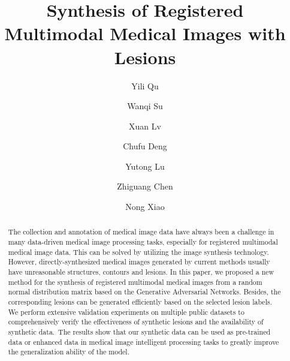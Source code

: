 \documentclass[runningheads]{llncs}
\begin{document}
	\title{Synthesis of Registered Multimodal
		Medical Images with Lesions}
	\author{ Yili Qu \and Wanqi Su \and Xuan Lv \and Chufu Deng 
		\and Yutong Lu \and Zhiguang Chen \and Nong Xiao}
	\maketitle       %
	\begin{abstract}
		The collection and annotation of medical image data have always been a challenge in many data-driven medical image processing tasks, especially for registered multimodal medical image data. This can be solved by utilizing the image synthesis technology. However, directly-synthesized medical images generated by current methods usually have unreasonable structures, contours and lesions. In this paper, we proposed a new method for the synthesis of registered multimodal medical images from a random normal distribution matrix based on the Generative Adversarial Networks. Besides, the corresponding lesions can be generated efficiently based on the selected lesion labels. We perform extensive validation experiments on multiple public datasets to comprehensively verify the effectiveness of synthetic lesions and the availability of synthetic data. The results show that our synthetic data can be used as pre-trained data or enhanced data in medical image intelligent processing tasks to greatly improve the generalization ability of the model. 
		
	\end{abstract}
\end{document}
